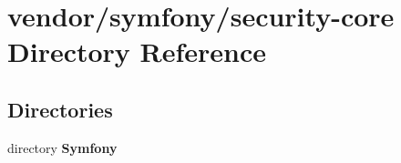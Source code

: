 \section{vendor/symfony/security-\/core Directory Reference}
\label{dir_c01ee74a509bf349c670a95860bb906f}
\subsection*{Directories}
\begin{DoxyCompactItemize}
\item 
directory {\bf Symfony}
\end{DoxyCompactItemize}
